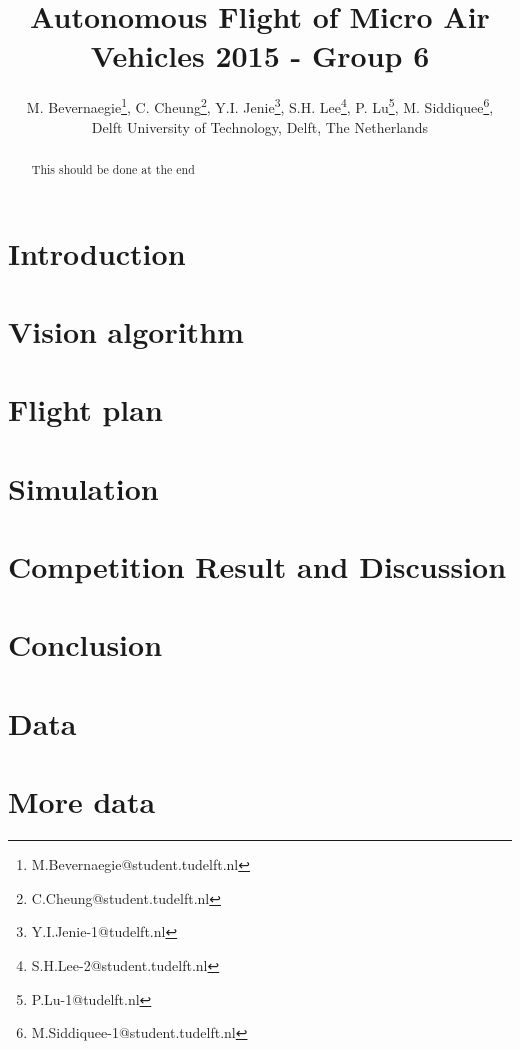 \documentclass{article}
\title{Autonomous Flight of Micro Air Vehicles 2015 - Group 6}
\author{M. Bevernaegie\thanks{M.Bevernaegie@student.tudelft.nl}, C. Cheung\thanks{C.Cheung@student.tudelft.nl}, Y.I. Jenie\thanks{Y.I.Jenie-1@tudelft.nl}, S.H. Lee\thanks{S.H.Lee-2@student.tudelft.nl}, P. Lu\thanks{P.Lu-1@tudelft.nl}, M. Siddiquee\thanks{M.Siddiquee-1@student.tudelft.nl}, \\ Delft University of Technology, Delft, The Netherlands}
\begin{document}
\maketitle

\begin{abstract}
{\color{red} This should be done at the end}


\end{abstract}

\section{Introduction} \label{section:introduction}



\section{Vision algorithm}



\section{Flight plan}




\section{Simulation}
\label{section:simulation}



\section{Competition Result and Discussion}

\section{Conclusion}





\appendix
\newcommand{\appsection}[1]{\let\oldthesection\thesection
  \renewcommand{\thesection}{Appendix \oldthesection:}
  \section{#1}\let\thesection\oldthesection}

\appsection{Data}
\appsection{More data}
\end{document}
